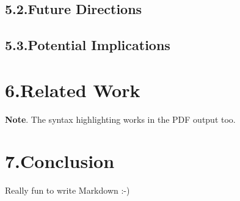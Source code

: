 \documentclass[preprint]{{sigplanconf}}
\begin{document}
\subsection{5.2.\hspace*{0.5em}Future Directions}\label{sec-future-directions}%

\subsection{5.3.\hspace*{0.5em}Potential Implications}\label{sec-potential-implications}%

\section{6.\hspace*{0.5em}Related Work}\label{sec-related-work}%

\noindent\textbf{Note}.
The syntax highlighting works in the PDF output too.%

\section{7.\hspace*{0.5em}Conclusion}\label{sec-conclusion}%

\noindent Really fun to write Markdown :-)%
\end{document}
